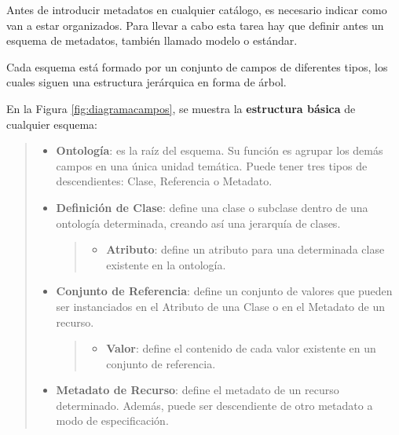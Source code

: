 Antes de introducir metadatos en cualquier catálogo, es necesario
indicar como van a estar organizados. Para llevar a cabo esta tarea hay
que definir antes un esquema de metadatos, también llamado modelo o
estándar.

Cada esquema está formado por un conjunto de campos de diferentes tipos,
los cuales siguen una estructura jerárquica en forma de árbol.


En la Figura \ref{fig:diagramacampos}, se muestra la \textbf{estructura básica} 
de cualquier esquema:

\begin{quote}
\begin{itemize}
\item
  \textbf{Ontología}: es la raíz del esquema. Su función es agrupar los
  demás campos en una única unidad temática. Puede tener tres tipos de
  descendientes: Clase, Referencia o Metadato.
\item
  \textbf{Definición de Clase}: define una clase o subclase dentro de
  una ontología determinada, creando así una jerarquía de clases.

  \begin{quote}
  \begin{itemize}
  \tightlist
  \item
    \textbf{Atributo}: define un atributo para una determinada clase
    existente en la ontología.
  \end{itemize}
  \end{quote}
\item
  \textbf{Conjunto de Referencia}: define un conjunto de valores que
  pueden ser instanciados en el Atributo de una Clase o en el Metadato
  de un recurso.

  \begin{quote}
  \begin{itemize}
  \tightlist
  \item
    \textbf{Valor}: define el contenido de cada valor existente en un
    conjunto de referencia.
  \end{itemize}
  \end{quote}
\item
  \textbf{Metadato de Recurso}: define el metadato de un recurso
  determinado. Además, puede ser descendiente de otro metadato a modo de
  especificación.
\end{itemize}
\end{quote}

